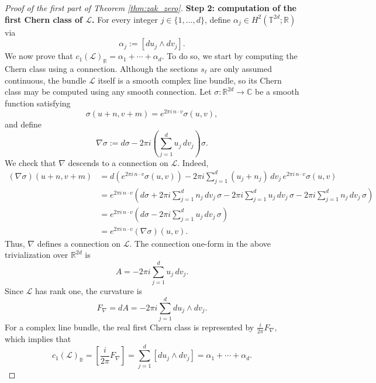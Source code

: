 \documentclass[reqno,a4paper,12pt]{amsart}
\numberwithin{equation}{section}
\newcommand\1{\mathds{1}}
\begin{document}
\begin{proof}[Proof of the first part of Theorem \ref{thm:zak_zero}]
\smallskip
\noindent\textbf{Step 2: computation of the first Chern class of $\mathcal L$.}
For every integer $j \in \{ 1,\dots,d \}$, define $\alpha_j \in H^2(\mathbb T^{2d};\mathbb R)$ via
$$
\alpha_j:=[du_j\wedge dv_j].
$$
We now prove that
$
c_1(\mathcal L)_{\mathbb R}
=
\alpha_1+\cdots+\alpha_d.
$
To do so, we start by computing the Chern class using a connection. Although the sections
$s_\ell$ are only assumed continuous, the bundle $\mathcal L$ itself is a smooth
complex line bundle, so its Chern class may be computed using any smooth connection.
Let $\sigma:\mathbb R^{2d}\to\mathbb C$ be a smooth function satisfying
$$
\sigma(u+n,v+m)=e^{2\pi i\,n\cdot v}\sigma(u,v),
$$
and define
$$
\nabla\sigma
:=
d\sigma
-
2\pi i
\left(\sum_{j=1}^d u_j\,dv_j\right)\sigma.
$$
We check that $\nabla$ descends to a connection on $\mathcal L$. Indeed,
$$
\begin{aligned}
(\nabla\sigma)(u+n,v+m)
&=
d\!\left(e^{2\pi i\,n\cdot v}\sigma(u,v)\right)
-
2\pi i\sum_{j=1}^d (u_j+n_j)\,dv_j\,
e^{2\pi i\,n\cdot v}\sigma(u,v) \\
&=
e^{2\pi i\,n\cdot v}
\left(
d\sigma
+
2\pi i\sum_{j=1}^d n_j\,dv_j\,\sigma
-
2\pi i\sum_{j=1}^d u_j\,dv_j\,\sigma
-
2\pi i\sum_{j=1}^d n_j\,dv_j\,\sigma
\right) \\
&=
e^{2\pi i\,n\cdot v}
\left(
d\sigma
-
2\pi i\sum_{j=1}^d u_j\,dv_j\,\sigma
\right) \\
&=
e^{2\pi i\,n\cdot v}(\nabla\sigma)(u,v).
\end{aligned}
$$
Thus, $\nabla$ defines a
connection on $\mathcal L$.
The connection one-form in the above trivialization over $\mathbb R^{2d}$ is
$$
A
=
-2\pi i\sum_{j=1}^d u_j\,dv_j.
$$
Since $\mathcal L$ has rank one, the curvature is
$$
F_\nabla=dA
=
-2\pi i\sum_{j=1}^d du_j\wedge dv_j.
$$
For a complex line bundle, the real first Chern class is represented by
$
\frac{i}{2\pi}F_\nabla,
$
which implies that
$$
c_1(\mathcal L)_{\mathbb R}
=
\left[\frac{i}{2\pi}F_\nabla\right]
=
\sum_{j=1}^d [du_j\wedge dv_j]
=
\alpha_1+\cdots+\alpha_d.
$$


\end{proof}
\end{document}

